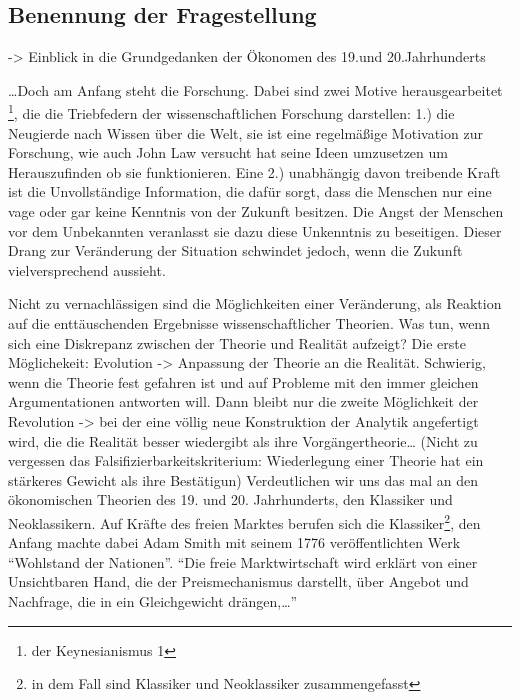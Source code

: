 \documentclass[
        onecolumn,
        a4paper,
        abstracton,
        parskip=half
        ,final
        ]{scrartcl}
\begin{document}
\subsection{Benennung der Fragestellung}

    -> Einblick in die Grundgedanken der {\"O}konomen des 19.und 20.Jahrhunderts

    \ldots Doch am Anfang steht die Forschung. Dabei sind zwei Motive herausgearbeitet \footnote[9]{der Keynesianismus 1},
    die die Triebfedern der wissenschaftlichen Forschung darstellen:
    1.) die Neugierde nach Wissen {\"u}ber die Welt, sie ist eine regelm{\"a}{\ss}ige Motivation zur Forschung, wie auch John Law versucht hat seine Ideen umzusetzen um Herauszufinden
     ob sie funktionieren. Eine 2.) unabh{\"a}ngig davon treibende Kraft ist die Unvollst{\"a}ndige Information, die daf{\"u}r sorgt, dass die Menschen nur eine vage oder gar keine Kenntnis von der Zukunft besitzen. Die Angst der Menschen vor dem Unbekannten veranlasst sie dazu diese Unkenntnis zu beseitigen. Dieser Drang zur Ver{\"a}nderung der Situation schwindet jedoch, wenn die Zukunft vielversprechend aussieht.

    Nicht zu vernachl{\"a}ssigen sind die M{\"o}glichkeiten einer Ver{\"a}nderung, als Reaktion auf
    die entt{\"a}uschenden Ergebnisse wissenschaftlicher Theorien. Was tun, wenn sich eine
    Diskrepanz zwischen der Theorie und Realit{\"a}t aufzeigt? Die erste M{\"o}glichekeit:
    Evolution -> Anpassung der Theorie an die Realit{\"a}t. Schwierig, wenn die Theorie fest
    gefahren ist und auf Probleme mit den immer gleichen Argumentationen antworten will.
    Dann bleibt nur die zweite M{\"o}glichkeit der Revolution -> bei der eine v{\"o}llig neue
    Konstruktion der Analytik angefertigt wird, die die Realit{\"a}t besser wiedergibt als ihre
    Vorg{\"a}ngertheorie\ldots
    (Nicht zu vergessen das Falsifizierbarkeitskriterium: Wiederlegung einer Theorie hat ein
    st{\"a}rkeres Gewicht als ihre Best{\"a}tigun)
    Verdeutlichen wir uns das mal an den {\"o}konomischen Theorien des 19. und 20. Jahrhunderts,
    den Klassiker und Neoklassikern.
    Auf Kr{\"a}fte des freien Marktes berufen sich die Klassiker\footnote[10]{in dem Fall sind Klassiker und Neoklassiker zusammengefasst}, den Anfang machte dabei
     Adam Smith mit seinem 1776 ver{\"o}ffentlichten Werk "`Wohlstand der Nationen"'.
    "`Die freie Marktwirtschaft wird erkl{\"a}rt von einer Unsichtbaren Hand, die der
    Preismechanismus darstellt, {\"u}ber Angebot und Nachfrage, die in ein Gleichgewicht dr{\"a}ngen,\ldots"'
\end{document}
